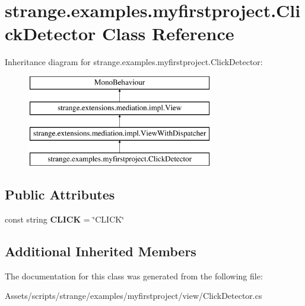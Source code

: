 \hypertarget{classstrange_1_1examples_1_1myfirstproject_1_1_click_detector}{\section{strange.\-examples.\-myfirstproject.\-Click\-Detector Class Reference}
\label{classstrange_1_1examples_1_1myfirstproject_1_1_click_detector}
}
Inheritance diagram for strange.\-examples.\-myfirstproject.\-Click\-Detector\-:\begin{figure}[H]
\begin{center}
\leavevmode
\includegraphics[height=4.000000cm]{classstrange_1_1examples_1_1myfirstproject_1_1_click_detector}
\end{center}
\end{figure}
\subsection*{Public Attributes}
\begin{DoxyCompactItemize}
\item 
\hypertarget{classstrange_1_1examples_1_1myfirstproject_1_1_click_detector_adee4bf8b89174cc860c599f884c9a535}{const string {\bfseries C\-L\-I\-C\-K} = \char`\"{}C\-L\-I\-C\-K\char`\"{}}\label{classstrange_1_1examples_1_1myfirstproject_1_1_click_detector_adee4bf8b89174cc860c599f884c9a535}

\end{DoxyCompactItemize}
\subsection*{Additional Inherited Members}


The documentation for this class was generated from the following file\-:\begin{DoxyCompactItemize}
\item 
Assets/scripts/strange/examples/myfirstproject/view/Click\-Detector.\-cs\end{DoxyCompactItemize}
